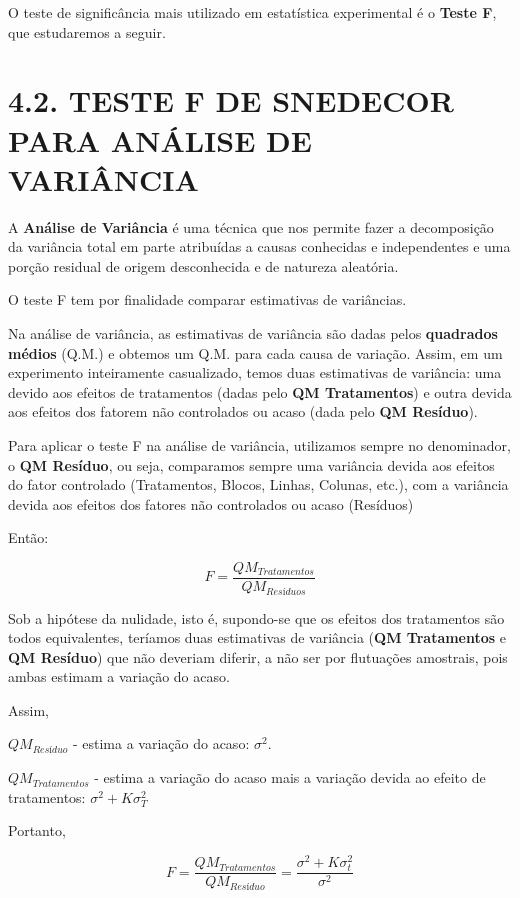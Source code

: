 \documentclass[
]{book}
\begin{document}
O teste de significância mais utilizado em estatística experimental é o \textbf{Teste F}, que estudaremos a seguir.

\hypertarget{teste-f-de-snedecor-para-anuxe1lise-de-variuxe2ncia}{%
\section{4.2. TESTE F DE SNEDECOR PARA ANÁLISE DE VARIÂNCIA}\label{teste-f-de-snedecor-para-anuxe1lise-de-variuxe2ncia}}

A \textbf{Análise de Variância} é uma técnica que nos permite fazer a decomposição da variância total em parte atribuídas a causas conhecidas e independentes e uma porção residual de origem desconhecida e de natureza aleatória.

O teste F tem por finalidade comparar estimativas de variâncias.

Na análise de variância, as estimativas de variância são dadas pelos \textbf{quadrados médios} (Q.M.) e obtemos um Q.M. para cada causa de variação. Assim, em um experimento inteiramente casualizado, temos duas estimativas de variância: uma devido aos efeitos de tratamentos (dadas pelo \textbf{QM Tratamentos}) e outra devida aos efeitos dos fatorem não controlados ou acaso (dada pelo \textbf{QM Resíduo}).

Para aplicar o teste F na análise de variância, utilizamos sempre no denominador, o \textbf{QM Resíduo}, ou seja, comparamos sempre uma variância devida aos efeitos do fator controlado (Tratamentos, Blocos, Linhas, Colunas, etc.), com a variância devida aos efeitos dos fatores não controlados ou acaso (Resíduos)

Então:

\[
F= \frac{QM_{Tratamentos} }{ QM_{Resíduos}}
\]

Sob a hipótese da nulidade, isto é, supondo-se que os efeitos dos tratamentos são todos equivalentes, teríamos duas estimativas de variância (\textbf{QM Tratamentos} e \textbf{QM Resíduo}) que não deveriam diferir, a não ser por flutuações amostrais, pois ambas estimam a variação do acaso.

Assim,

\(QM_{Resíduo}\) - estima a variação do acaso: \(\sigma^2\).

\(QM_{Tratamentos}\) - estima a variação do acaso mais a variação devida ao efeito de tratamentos: \(\sigma^2 + K \sigma^2_T\)

Portanto,

\[
F=\frac{QM_{Tratamentos}}{QM_{Resíduo} } = \frac{\sigma^2+K\sigma^2_t}{\sigma^2}
\]
\end{document}
